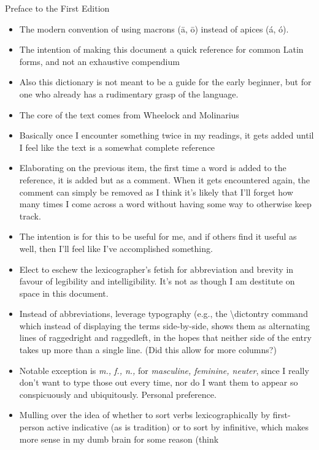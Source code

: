 Preface to the First Edition

\begin{itemize}
  \item The modern convention of using macrons (\=a, \=o)
    instead of apices (\'a, \'o).
  \item The intention of making this document a quick reference
    for common Latin forms, and not an exhaustive compendium
  \item Also this dictionary is not meant to be a guide for the
    early beginner, but for one who already has a rudimentary
    grasp of the language.
  \item The core of the text comes from Wheelock and Molinarius
  \item Basically once I encounter something twice in my readings,
    it gets added until I feel like the text is a somewhat
    complete reference
  \item Elaborating on the previous item, the first time a word
    is added to the reference, it is added but as a comment.  When
    it gets encountered again, the comment can simply be removed
    as I think it's likely that I'll forget how many times I come
    across a word without having some way to otherwise keep track.
  \item The intention is for this to be useful for me, and if others
    find it useful as well, then I'll feel like I've accomplished
    something.
  \item Elect to eschew the lexicographer's fetish for abbreviation
    and brevity in favour of legibility and intelligibility.  It's
    not as though I am destitute on space in this document.
  \item Instead of abbreviations, leverage typography (e.g., the
    \textbackslash dictontry command which instead of displaying the terms
    side-by-side, shows them as alternating lines of raggedright
    and raggedleft, in the hopes that neither side of the entry
    takes up more than a single line.  (Did this allow for more
    columns?)
  \item Notable exception is \textit{m., f., n.,} for \textit{%
    masculine, feminine, neuter}, since I really don't want to
    type those out every time, nor do I want them to appear so
    conspicuously and ubiquitously.  Personal preference.
  \item Mulling over the idea of whether to sort verbs
    lexicographically by first-person active indicative (as
    is tradition) or to sort by infinitive, which makes
    more sense in my dumb brain for some reason (think

\end{itemize}
